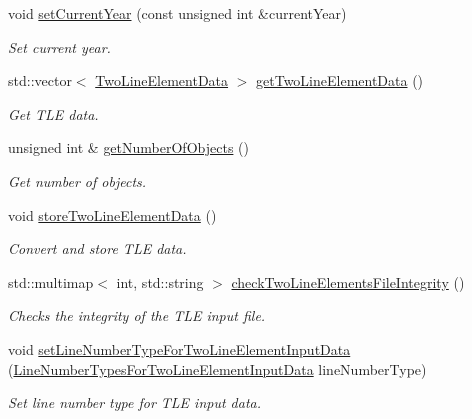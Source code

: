\begin{DoxyCompactItemize}
void \hyperlink{classtudat_1_1input__output_1_1TwoLineElementsTextFileReader_a18f89b2ca35478fef0fffe283175a874}{set\+Current\+Year} (const unsigned int \&current\+Year)
\begin{DoxyCompactList}\small\item\em Set current year. \end{DoxyCompactList}\item 
std\+::vector$<$ \hyperlink{structtudat_1_1input__output_1_1TwoLineElementData}{Two\+Line\+Element\+Data} $>$ \hyperlink{classtudat_1_1input__output_1_1TwoLineElementsTextFileReader_a2ef031067c717c097d6c6d14a49c2e5f}{get\+Two\+Line\+Element\+Data} ()
\begin{DoxyCompactList}\small\item\em Get T\+LE data. \end{DoxyCompactList}\item 
unsigned int \& \hyperlink{classtudat_1_1input__output_1_1TwoLineElementsTextFileReader_aae25280db0251175b72c4cfe19a4b941}{get\+Number\+Of\+Objects} ()
\begin{DoxyCompactList}\small\item\em Get number of objects. \end{DoxyCompactList}\item 
void \hyperlink{classtudat_1_1input__output_1_1TwoLineElementsTextFileReader_a63139886052a411c51d478baa0e6acca}{store\+Two\+Line\+Element\+Data} ()
\begin{DoxyCompactList}\small\item\em Convert and store T\+LE data. \end{DoxyCompactList}\item 
std\+::multimap$<$ int, std\+::string $>$ \hyperlink{classtudat_1_1input__output_1_1TwoLineElementsTextFileReader_a5c9c395c18303c160bc703ee610e7dc6}{check\+Two\+Line\+Elements\+File\+Integrity} ()
\begin{DoxyCompactList}\small\item\em Checks the integrity of the T\+LE input file. \end{DoxyCompactList}\item 
void \hyperlink{classtudat_1_1input__output_1_1TwoLineElementsTextFileReader_ad04a9234f3cdcbc7d7750640db8c2940}{set\+Line\+Number\+Type\+For\+Two\+Line\+Element\+Input\+Data} (\hyperlink{classtudat_1_1input__output_1_1TwoLineElementsTextFileReader_a9db390faac8ed1943fa3ded4161a88e5}{Line\+Number\+Types\+For\+Two\+Line\+Element\+Input\+Data} line\+Number\+Type)
\begin{DoxyCompactList}\small\item\em Set line number type for T\+LE input data. \end{DoxyCompactList}\end{DoxyCompactItemize}
